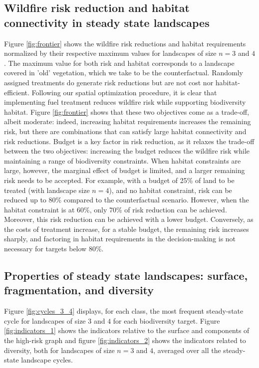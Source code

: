 \subsection{Wildfire risk reduction and habitat connectivity in steady state landscapes}

Figure \ref{fig:frontier} shows the wildfire risk reductions and habitat requirements normalized by their respective maximum values for landscapes of size $n=3$ and $4$. The maximum value for both risk and habitat corresponds to a landscape covered in 'old' vegetation, which we take to be the counterfactual. 
Randomly assigned treatments do generate risk reductions but are not cost nor habitat-efficient. Following our spatial optimization procedure, it is clear that implementing fuel treatment reduces wildfire risk while supporting biodiversity habitat. Figure \ref{fig:frontier} shows that these two objectives come as a trade-off, albeit moderate: indeed, increasing habitat requirements increases the remaining risk, but there are combinations that can satisfy large habitat connectivity and risk reductions. 
Budget is a key factor in risk reduction, as it relaxes the trade-off between the two objectives: increasing the budget reduces the wildfire risk while maintaining a range of biodiversity constraints. When habitat constraints are large, however, the marginal effect of budget is limited, and a larger remaining risk needs to be accepted. For example, with a budget of 25\% of land to be treated (with landscape size $n=4$), and no habitat constraint, risk can be reduced up to 80\% compared to the counterfactual scenario. However, when the habitat constraint is at 60\%, only 70\% of risk reduction can be achieved. Moreover, this risk reduction can be achieved with a lower budget. Conversely, as the costs of treatment increase, for a stable budget, the remaining risk increases sharply, and factoring in habitat requirements in the decision-making is not necessary for targets below 80\%. 

\subsection{Properties of steady state landscapes: surface, fragmentation, and diversity}
Figure \ref{fig:cycles_3_4} displays, for each class, the most frequent steady-state cycle for landscapes of size $3$ and $4$ for each biodiversity target. 
Figure \ref{fig:indicators_1} shows the indicators relative to the surface and components of the high-risk graph and figure \ref{fig:indicators_2} shows the indicators related to diversity, both for landscapes of size $n=3$ and $4$, averaged over all the steady-state landscape cycles. 


